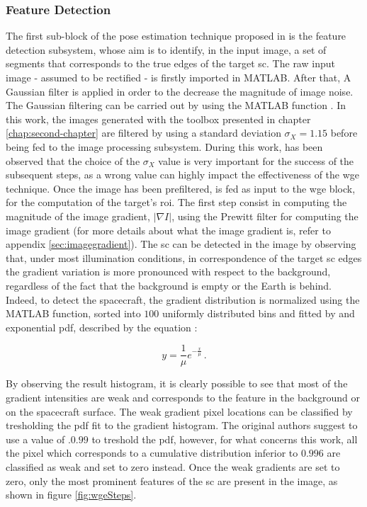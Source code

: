 \subsubsection{Feature Detection}
The first sub-block of the pose estimation technique proposed in \cite{Sharma2018} is the feature detection subsystem, whose aim is to  identify, in the input image, a set of segments that corresponds to the true edges of the target \acrshort{sc}.
The raw input image - assumed to be rectified - is firstly imported in MATLAB. After that, A Gaussian filter is applied in order to the decrease the magnitude of image noise. The Gaussian filtering can be carried out by using the MATLAB function . In this work, the images generated with the toolbox presented in chapter \ref{chap:second-chapter} are filtered by using a standard deviation $\sigma_X = 1.15$ before being fed to the image processing subsystem. During this work, has been observed that the choice of the $\sigma_X$ value is very important for the success of the subsequent steps, as a wrong value can highly impact the effectiveness of the \acrshort{wge} technique. Once the image has been prefiltered, is fed as input to the \acrshort{wge} block, for the computation of the target's \acrshort{roi}. The first step consist in computing the magnitude of the image gradient, $|\nabla I|$,  using the Prewitt filter for computing the image gradient (for more details about what the image gradient is, refer to appendix \ref{sec:imagegradient}).
The \acrshort{sc} can be detected in the image by observing that, under most illumination conditions, in correspondence of the target \acrshort{sc} edges the gradient variation is more pronounced with respect to the background, regardless of the fact that the background is empty or the Earth is behind.
Indeed, to detect the spacecraft, the gradient distribution is normalized using the MATLAB  function, sorted into $100$ uniformly distributed bins and fitted by and exponential \acrfull{pdf}, described by the equation :

\begin{equation*}
  y = \frac{1}{\mu} e^{-\frac{x}{\mu}} \,.
\end{equation*}

By observing the result histogram, it is clearly possible to see that most of the gradient intensities are weak and corresponds to the feature in the background or on the spacecraft surface. The weak gradient pixel locations can be classified by tresholding the \acrshort{pdf} fit to the gradient histogram. The original authors suggest to use a value of $.0.99$ to treshold the \acrshort{pdf}, however, for what concerns this work, all the pixel which corresponds to a cumulative distribution inferior to $0.996$ are classified as weak and set to zero instead. Once the weak gradients are set to zero, only the most prominent features of the \acrshort{sc} are present in the image, as shown in figure \ref{fig:wgeSteps}.

